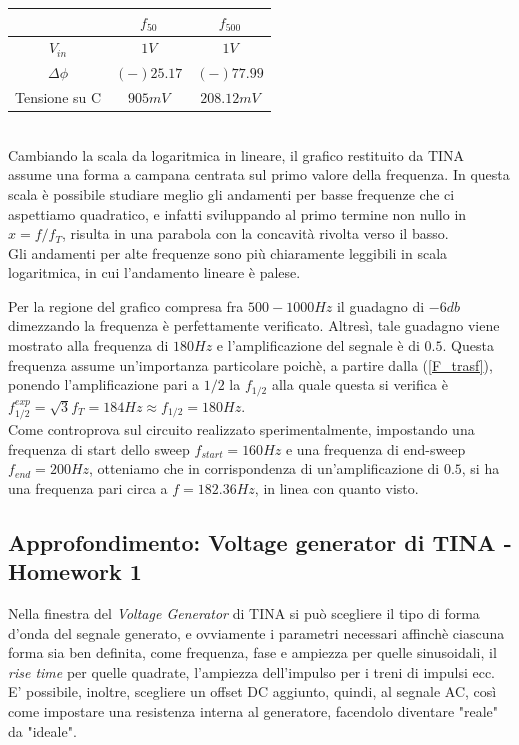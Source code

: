 \documentclass[journal, a4paper]{IEEEtran}
\begin{document}
\begin{tabular}{|c|c|c|}
\hline  & $f_{50}$ & $f_{500}$ \\ 
\hline $V_{in}$ & $1 \si{V}$ & $1 \si{V}$ \\ 
\hline $\Delta \phi $& $(-)25.17$  & $(-)77.99$ \\ 
\hline Tensione su C & $905 \si{mV}$ & $208.12 \si{mV}$ \\ 
\hline 
\end{tabular} \\

Cambiando la scala da logaritmica in lineare, il grafico restituito da \textsc{TINA} assume una forma a campana centrata sul primo valore della frequenza. In questa scala è possibile studiare meglio gli andamenti per basse frequenze che ci aspettiamo quadratico, e infatti sviluppando al primo termine non nullo in $x= f/f_T$, risulta in una parabola con la concavità rivolta verso il basso. \\
Gli andamenti per alte frequenze sono più chiaramente leggibili in scala logaritmica, in cui l'andamento lineare è palese.

Per la regione del grafico compresa fra $500-1000 \si{Hz}$ il guadagno di $-6db$ dimezzando la frequenza è perfettamente verificato. Altresì, tale guadagno viene mostrato alla frequenza di $180\si{Hz}$ e l'amplificazione del segnale è di $0.5$. Questa frequenza assume un'importanza particolare poichè, a partire dalla (\ref{F_trasf}), ponendo l'amplificazione pari a $1/2$ la $f_{1/2}$ alla quale questa si verifica è $f_{1/2}^{exp} = \sqrt{3}f_T = 184 \si{Hz} \approx f_{1/2} = 180 \si{Hz} $.\\

Come controprova sul circuito realizzato sperimentalmente, impostando una frequenza di start dello sweep $f_{start} = 160 \si{Hz}$ e una frequenza di end-sweep $f_{end} = 200 \si{Hz}$, otteniamo che in corrispondenza di un'amplificazione di $0.5$, si ha una frequenza pari circa a $f = 182.36 \si{Hz}$, in linea con quanto visto.

\subsection{Approfondimento: Voltage generator di TINA - Homework 1}
Nella finestra del \textit{Voltage Generator} di TINA si può scegliere il tipo di forma d'onda del segnale generato, e ovviamente i parametri necessari affinchè ciascuna forma sia ben definita, come frequenza, fase e ampiezza per quelle sinusoidali, il \textit{rise time} per quelle quadrate, l'ampiezza dell'impulso per i treni di impulsi ecc.\\
E' possibile, inoltre, scegliere un offset DC aggiunto, quindi, al segnale AC, così come impostare una resistenza interna al generatore, facendolo diventare "reale" da "ideale".
\end{document}
